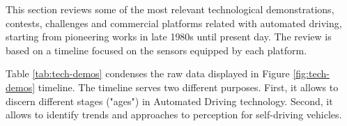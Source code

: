 

This section reviews some of the most relevant technological demonstrations,
contests, challenges and commercial platforms related with automated driving, 
starting from pioneering works in late 1980s until present day. The review is
based on a timeline focused on the sensors equipped by each platform.

Table \ref{tab:tech-demos} condenses the raw data displayed in Figure 
\ref{fig:tech-demos} timeline. The timeline serves two different purposes. 
First, it allows to discern different stages ("ages") in Automated Driving 
technology. Second, it allows to identify trends and approaches to perception 
for self-driving vehicles.



